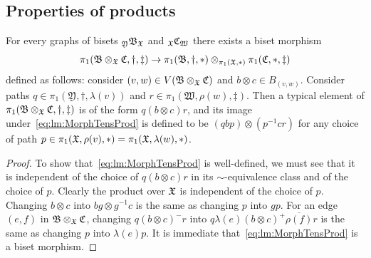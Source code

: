 \documentclass{amsart}
\begin{document}
\subsection{Properties of products}\label{ss:PropOfTensProd}
\begin{lem}\label{lm:MorphTensProd}
  For every graphs of bisets ${}_{\mathfrak Y}\mathfrak B_{\mathfrak X}$ and
  ${}_{\mathfrak X}\mathfrak C_{\mathfrak W}$ there exists a biset morphism
  \begin{equation}\label{eq:lm:MorphTensProd}
    \pi_1(\mathfrak B\otimes_{\mathfrak X}\mathfrak C,\dagger,\ddagger)\to\pi_1(\mathfrak
    B,\dagger,*)\otimes_{\pi_1({\mathfrak X},*)} \pi_1(\mathfrak C,*,\ddagger)
  \end{equation}
  defined as follows: consider $(v,w)\in V(\mathfrak B\otimes_{\mathfrak X}\mathfrak
  C)$ and $b\otimes c\in B_{(v,w)}$. Consider paths $q\in\pi_1(\mathfrak
  Y,\dagger,\lambda(v))$ and $r\in\pi_1(\mathfrak
  W,\rho(w),\ddagger)$. Then a typical element of $\pi_1(\mathfrak
  B\otimes_{\mathfrak X}\mathfrak C,\dagger,\ddagger)$ is of the form $q(b\otimes
  c)r$, and its image under~\eqref{eq:lm:MorphTensProd} is defined to be
  $(q b p)\otimes(p^{-1}c r)$ for any choice of path
  $p\in\pi_1({\mathfrak X},\rho(v),*)=\pi_1({\mathfrak X},\lambda(w),*)$.
\end{lem}
\begin{proof}
  To show that~\eqref{eq:lm:MorphTensProd} is well-defined, we must see
  that it is independent of the choice of $q(b\otimes c)r$ in its
  $\sim$-equivalence class and of the choice of $p$. Clearly the product
  over ${\mathfrak X}$ is independent of the choice of $p$. Changing $b\otimes c$ into
  $b g\otimes g^{-1}c$ is the same as changing $p$ into $g p$. For an edge
  $(e,f)$ in $\mathfrak B\otimes_{\mathfrak X}\mathfrak C$, changing $q(b\otimes
  c)^-r$ into $q\lambda(e)(b\otimes c)^+\overline{\rho(f)}r$ is the same as
  changing $p$ into $\lambda(e)p$. It is immediate
  that~\eqref{eq:lm:MorphTensProd} is a biset morphism.
\end{proof}
\end{document}
